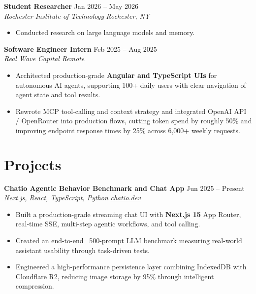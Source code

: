 \documentclass[10pt,letterpaper]{article}
\newif\ifresumeFirstRole
\newcommand{\resumeRole}[4]{%
  \ifresumeFirstRole
    \global\resumeFirstRolefalse
  \else
    \vspace{0pt plus 1fill}%
  \fi
  \textbf{#1} \hfill #2\\
  \textit{#3} \hfill \textit{#4}
}
\begin{document}
\resumeRole{Student Researcher}{Jan 2026 -- May 2026}{Rochester Institute of Technology}{Rochester, NY}
\begin{itemize}
  \item Conducted research on large language models and memory.
\end{itemize}

\resumeRole{Software Engineer Intern}{Feb 2025 -- Aug 2025}{Real Wave Capital}{Remote}
\begin{itemize}
  \item Architected production-grade \textbf{Angular and TypeScript UIs} for autonomous AI agents, supporting 100+ daily users with clear navigation of agent state and tool results.
  \item Rewrote MCP tool-calling and context strategy and integrated OpenAI API / OpenRouter into production flows, cutting token spend by roughly 50\% and improving endpoint response times by 25\% across 6,000+ weekly requests.
\end{itemize}

\section*{Projects}
\resumeRole{Chatio Agentic Behavior Benchmark and Chat App}{Jun 2025 -- Present}{Next.js, React, TypeScript, Python}{\href{https://chatio.dev}{chatio.dev}}
\begin{itemize}
  \item Built a production-grade streaming chat UI with \textbf{Next.js 15} App Router, real-time SSE, multi-step agentic workflows, and tool calling.
  \item Created an end-to-end ~500-prompt LLM benchmark measuring real-world assistant usability through task-driven tests.
  \item Engineered a high-performance persistence layer combining IndexedDB with Cloudflare R2, reducing image storage by 95\% through intelligent compression.
\end{itemize}
\end{document}
